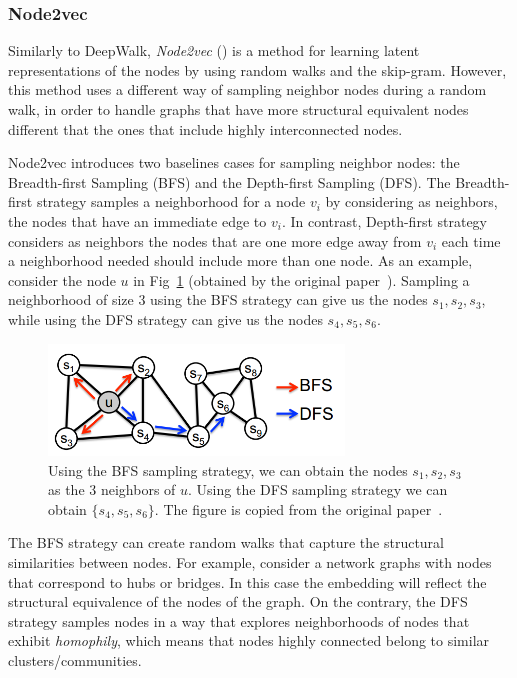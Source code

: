 \subsubsection{Node2vec}

Similarly to DeepWalk, \emph{Node2vec} (\cite{grover2016node2vec}) is a method
for learning latent representations of the nodes by using random walks and the
skip-gram. However, this method uses a different way of sampling neighbor
nodes during a random walk, in order to handle graphs that have more structural
equivalent nodes different that the ones that include highly interconnected
nodes.

Node2vec introduces two baselines cases for sampling neighbor nodes: the
Breadth-first Sampling (BFS) and the Depth-first Sampling (DFS).
The Breadth-first strategy samples a neighborhood for a node $v_i$ by
considering as neighbors, the nodes that have an immediate edge to $v_i$.
In contrast, Depth-first strategy considers as neighbors the nodes that are
one more edge away from $v_i$ each time a neighborhood needed should include
more than one node. As an example, consider the node $u$ in
Fig~\ref{sampling_strategies} (obtained by the original
paper~\cite{grover2016node2vec}). Sampling a neighborhood of size 3 using the
BFS strategy can give us the nodes $s_1, s_2, s_3$, while using the DFS strategy
can give us the nodes $s_4, s_5, s_6$.
\begin{figure}
\begin{center}
\includegraphics[width=0.7\textwidth]{figures/sampling.png}
\end{center}
\caption{Using the BFS sampling strategy, we can obtain the nodes
$s_1, s_2, s_3$ as the 3 neighbors of $u$. Using the DFS sampling strategy we
can obtain $\{s_4, s_5, s_6\}$. The figure is copied from the original
paper~\cite{grover2016node2vec}.}
\label{sampling_strategies}
\end{figure}
The BFS strategy can create random walks that capture the structural similarities
between nodes. For example, consider a network graphs with nodes that correspond
to hubs or bridges. In this case the embedding will reflect the structural
equivalence of the nodes of the graph.
On the contrary, the DFS strategy samples nodes in a way that explores
neighborhoods of nodes that exhibit \emph{homophily}, which means that nodes
highly connected belong to similar clusters/communities.

